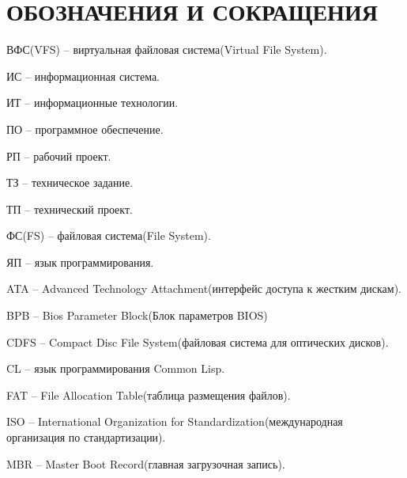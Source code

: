 \section*{ОБОЗНАЧЕНИЯ И СОКРАЩЕНИЯ}

ВФС(VFS) -- виртуальная файловая система(Virtual File System).

ИС -- информационная система.

ИТ -- информационные технологии. 

ПО -- программное обеспечение.

РП -- рабочий проект.

ТЗ -- техническое задание.

ТП -- технический проект.

ФС(FS) -- файловая система(File System).

ЯП -- язык программирования.

ATA -- Advanced Technology Attachment(интерфейс доступа к жестким дискам).

BPB -- Bios Parameter Block(Блок параметров BIOS)

CDFS -- Compact Disc File System(файловая система для оптических дисков).

CL -- язык программирования Common Lisp.

FAT -- File Allocation Table(таблица размещения файлов).

ISO -- International Organization for Standardization(международная организация по стандартизации).

MBR -- Master Boot Record(главная загрузочная запись).